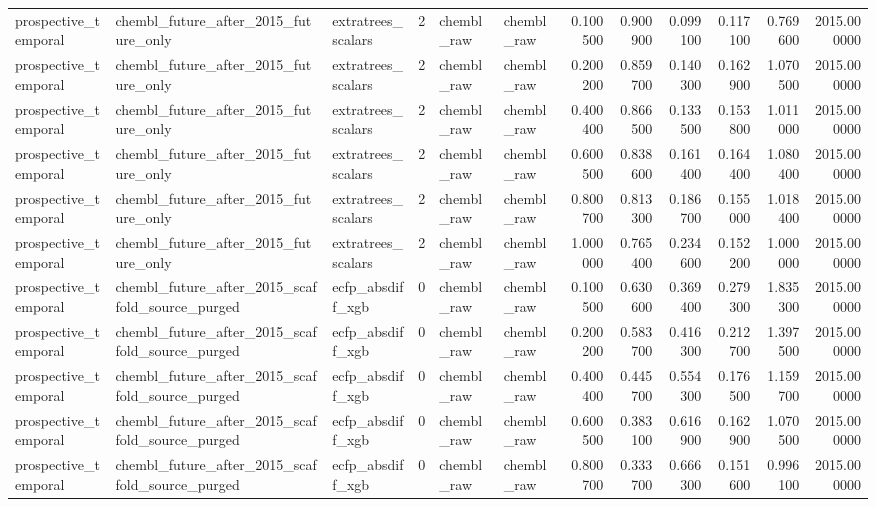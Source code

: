 \begin{longtable}{lllrllrrrrrr}
prospective\_temporal & chembl\_future\_after\_2015\_future\_only & extratrees\_scalars & 2 & chembl\_raw & chembl\_raw & 0.100500 & 0.900900 & 0.099100 & 0.117100 & 0.769600 & 2015.000000 \\
prospective\_temporal & chembl\_future\_after\_2015\_future\_only & extratrees\_scalars & 2 & chembl\_raw & chembl\_raw & 0.200200 & 0.859700 & 0.140300 & 0.162900 & 1.070500 & 2015.000000 \\
prospective\_temporal & chembl\_future\_after\_2015\_future\_only & extratrees\_scalars & 2 & chembl\_raw & chembl\_raw & 0.400400 & 0.866500 & 0.133500 & 0.153800 & 1.011000 & 2015.000000 \\
prospective\_temporal & chembl\_future\_after\_2015\_future\_only & extratrees\_scalars & 2 & chembl\_raw & chembl\_raw & 0.600500 & 0.838600 & 0.161400 & 0.164400 & 1.080400 & 2015.000000 \\
prospective\_temporal & chembl\_future\_after\_2015\_future\_only & extratrees\_scalars & 2 & chembl\_raw & chembl\_raw & 0.800700 & 0.813300 & 0.186700 & 0.155000 & 1.018400 & 2015.000000 \\
prospective\_temporal & chembl\_future\_after\_2015\_future\_only & extratrees\_scalars & 2 & chembl\_raw & chembl\_raw & 1.000000 & 0.765400 & 0.234600 & 0.152200 & 1.000000 & 2015.000000 \\
prospective\_temporal & chembl\_future\_after\_2015\_scaffold\_source\_purged & ecfp\_absdiff\_xgb & 0 & chembl\_raw & chembl\_raw & 0.100500 & 0.630600 & 0.369400 & 0.279300 & 1.835300 & 2015.000000 \\
prospective\_temporal & chembl\_future\_after\_2015\_scaffold\_source\_purged & ecfp\_absdiff\_xgb & 0 & chembl\_raw & chembl\_raw & 0.200200 & 0.583700 & 0.416300 & 0.212700 & 1.397500 & 2015.000000 \\
prospective\_temporal & chembl\_future\_after\_2015\_scaffold\_source\_purged & ecfp\_absdiff\_xgb & 0 & chembl\_raw & chembl\_raw & 0.400400 & 0.445700 & 0.554300 & 0.176500 & 1.159700 & 2015.000000 \\
prospective\_temporal & chembl\_future\_after\_2015\_scaffold\_source\_purged & ecfp\_absdiff\_xgb & 0 & chembl\_raw & chembl\_raw & 0.600500 & 0.383100 & 0.616900 & 0.162900 & 1.070500 & 2015.000000 \\
prospective\_temporal & chembl\_future\_after\_2015\_scaffold\_source\_purged & ecfp\_absdiff\_xgb & 0 & chembl\_raw & chembl\_raw & 0.800700 & 0.333700 & 0.666300 & 0.151600 & 0.996100 & 2015.000000 \\

\end{longtable}

